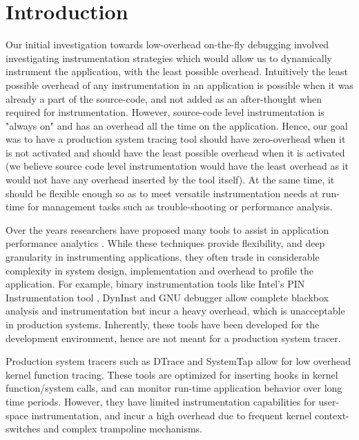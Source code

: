 \section{Introduction}
\label{sec:intro}

Our initial investigation towards low-overhead on-the-fly debugging involved investigating instrumentation strategies which would allow us to dynamically instrument the application, with the least possible overhead.
Intuitively the least possible overhead of any instrumentation in an application is possible when it was already a part of the source-code, and not added as an after-thought when required for instrumentation.
However, source-code level instrumentation is "always on" and has an overhead all the time on the application.
Hence, our goal was to have a production system tracing tool should have zero-overhead when it is not activated and should have the least possible overhead when it is activated (we believe source code level instrumentation would have the least overhead as it would not have any overhead inserted by the tool itself). 
At the same time, it should be flexible enough so as to meet versatile instrumentation needs at run-time for management tasks such as trouble-shooting or performance analysis.

Over the years researchers have proposed many tools to assist in application performance analytics \cite{pin,gdb,dtrace,systemtap,lttng,utrace,ptrace,dyninst}.
While these techniques provide flexibility, and deep granularity in instrumenting applications, they often trade in considerable complexity in system design, implementation and overhead to profile the application. 
For example, binary instrumentation tools like Intel's PIN Instrumentation tool \cite{pin}, DynInst \cite{dyninst} and GNU debugger \cite{gdb} allow complete blackbox analysis and instrumentation but incur a heavy overhead, which is unacceptable in production systems. 
Inherently, these tools have been developed for the development environment, hence are not meant for a production system tracer.

Production system tracers such as DTrace\cite{dtrace} and SystemTap\cite{systemtap} allow for low overhead kernel function tracing.
These tools are optimized for inserting hooks in kernel function/system calls, and can monitor run-time application behavior over long time periods. 
However, they have limited instrumentation capabilities for user-space instrumentation, and incur a high overhead due to frequent kernel context-switches and complex trampoline mechanisms.

